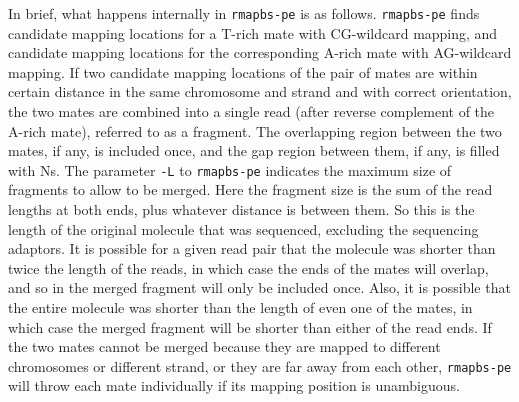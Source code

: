 \documentclass[10pt]{article}
\newcommand{\prog}[1]{\texttt{#1}}
\newcommand{\fn}[1]{\texttt{#1}}
\newcommand{\op}[1]{\texttt{#1}}
\begin{document}
In brief, what happens internally in \prog{rmapbs-pe} is as follows.
\prog{rmapbs-pe} finds candidate mapping locations for a T-rich mate
with CG-wildcard mapping, and candidate mapping locations for the
corresponding A-rich mate with AG-wildcard mapping. If two candidate
mapping locations of the pair of mates are within certain distance in
the same chromosome and strand and with correct orientation, the two
mates are combined into a single read (after reverse complement of the
A-rich mate), referred to as a fragment. The overlapping region
between the two mates, if any, is included once, and the gap region
between them, if any, is filled with Ns. The parameter \op{-L} to
\prog{rmapbs-pe} indicates the maximum size of fragments to allow to
be merged. Here the fragment size is the sum of the read lengths at
both ends, plus whatever distance is between them. So this is the
length of the original molecule that was sequenced, excluding the
sequencing adaptors. It is possible for a given read pair that the
molecule was shorter than twice the length of the reads, in which case
the ends of the mates will overlap, and so in the merged fragment will
only be included once. Also, it is possible that the entire molecule
was shorter than the length of even one of the mates, in which case
the merged fragment will be shorter than either of the read ends. If
the two mates cannot be merged because they are mapped to different
chromosomes or different strand, or they are far away from each other,
\prog{rmapbs-pe} will throw each mate individually if its mapping
position is unambiguous.


\end{document}
